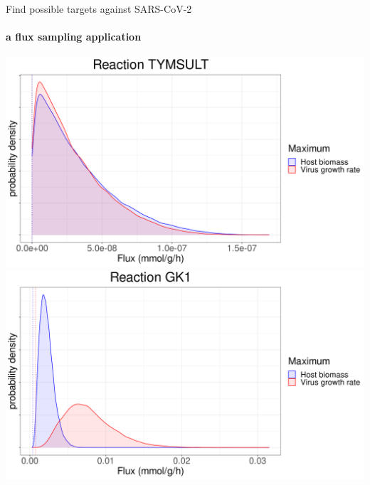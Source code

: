 \documentclass{beamer}
\begin{document}
   \begin{frame}{Find possible targets against SARS-CoV-2}
      \framesubtitle{a flux sampling application}      



      \centerline{
      \includegraphics[scale=0.21]{
          ../met_nets/resources//density_flux_TYMSULT_fba_2_transparent
         } 
      \includegraphics[scale=0.21]{
          ../met_nets/resources//density_flux_gk1_fba_2_transparent
         }
      }


\end{frame}
\end{document}
